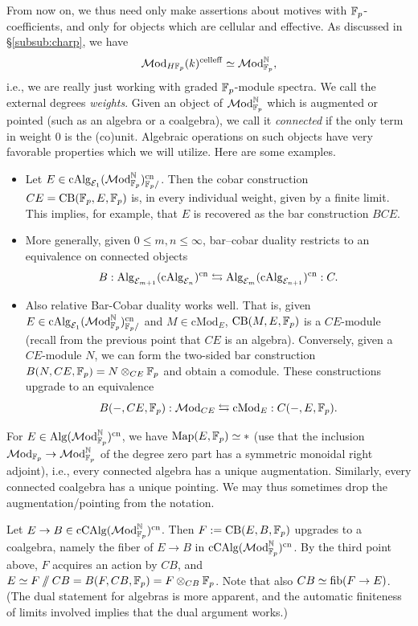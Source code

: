 \documentclass{amsart}
\numberwithin{proposition}{section}
\numberwithin{equation}{section}
\def\cell{\mathrm{cell}}
\def\cCAlg{\mathrm{cCAlg}}
\newcommand{\cMod}{\mathrm{cMod}}
\def\cn{\mathrm{cn}}
\newcommand{\CB}{\mathrm{CB}}
\begin{document}
From now on, we thus need only make assertions about motives with $\mathbb{F}_p$-coefficients, and only for objects which are cellular and effective.
As discussed in \S\ref{subsub:charp}, we have \[ \Mod_{H\F_p}(k)^{\cell\eff} \wequi \Mod_{\F_p}^\N, \] i.e., we are really just working with graded $\mathbb{F}_p$-module spectra.
We call the external degrees \emph{weights}.
Given an object of $\mathcal{M}\mathrm{od}_{\mathbb{F}_p}^{\mathbb{N}}$ which is augmented or pointed (such as an algebra or a coalgebra), we call it \emph{connected} if the only term in weight $0$ is the (co)unit.
Algebraic operations on such objects have very favorable properties which we will utilize.
Here are some examples.
\begin{itemize}
\item Let $E \in \cAlg_{\scr E_1}(\Mod_{\F_p}^\N)^\cn_{\F_p/}$.
  Then the cobar construction $CE = \CB(\F_p, E, \F_p)$ is, in every individual weight, given by a finite limit.
  This implies, for example, that $E$ is recovered as the bar construction $BCE$.
\item More generally, given $0 \le m,n \le \infty$, bar--cobar duality restricts to an equivalence on connected objects \cite[Theorem~A.6 and its proof]{burklund2022multiplicative}
\[
B: \Alg_{\scr E_{m+1}}(\cAlg_{\scr E_n})^\cn
\adj
\Alg_{\scr E_m}(\cAlg_{\scr E_{n+1}})^\cn : C.
\]
\item Also relative Bar-Cobar duality works well.
  That is, given $E \in \cAlg_{\scr E_1}(\Mod_{\F_p}^\N)^\cn_{\F_p/}$ and $M \in \cMod_E$, $\CB(M, E, \F_p)$ is a $CE$-module (recall from the previous point that $CE$ is an algebra).
  Conversely, given a $CE$-module $N$, we can form the two-sided bar construction $B(N, CE, \mathbb{F}_p) = N \otimes_{CE} \mathbb{F}_p$ and obtain a comodule.
  These constructions upgrade to an equivalence \cite[Theorem~4.18]{matsuoka2014koszul} \[ B(\ph, CE, \F_p): \Mod_{CE} \adj \cMod_E: C(\ph, E, \F_p). \]
\end{itemize}

\begin{remark} \label{rmk:automatic-augmentation}
For $E \in \Alg(\Mod_{\F_p}^\N)^\cn$, we have $\mathrm{Map}(E, \mathbb{F}_p) \simeq *$ (use that the inclusion $\mathcal{M}\mathrm{od}_{\mathbb{F}_p} \to \mathcal{M}\mathrm{od}_{\mathbb{F}_p}^{\mathbb{N}}$ of the degree zero part has a symmetric monoidal right adjoint), i.e., every connected algebra has a unique augmentation.
Similarly, every connected coalgebra has a unique pointing.
We may thus sometimes drop the augmentation/pointing from the notation.
\end{remark}

\begin{example} \label{ex:rotate-fiber-seq}
Let $E \to B \in \cCAlg(\Mod_{\F_p}^\N)^\cn$.
Then $F := \CB(E, B, \F_p)$ upgrades to a coalgebra, namely the fiber of $E \to B$ in $\cCAlg(\Mod_{\F_p}^\N)^\cn$.
By the third point above, $F$ acquires an action by $CB$, and $E \simeq F \sslash CB = B(F, CB, \mathbb{F}_p) = F \otimes_{CB} \mathbb{F}_p$.
Note that also $CB \simeq \mathrm{fib}(F \to E)$.
(The dual statement for algebras is more apparent, and the automatic finiteness of limits involved implies that the dual argument works.)
\end{example}
\end{document}
